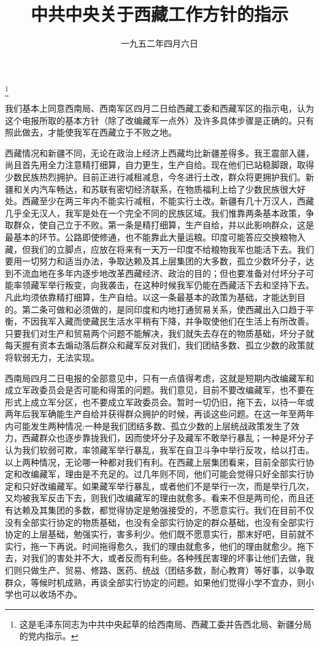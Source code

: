 
\title{中共中央关于西藏工作方针的指示}
\date{一九五二年四月六日}
\thanks{这是毛泽东同志为中共中央起草的给西南局、西藏工委并告西北局、新疆分局的党内指示。}
\maketitle


我们基本上同意西南局、西南军区四月二日给西藏工委和西藏军区的指示电，认为这个电报所取的基本方针（除了改编藏军一点外）及许多具体步骤是正确的。只有照此做去，才能使我军在西藏立于不败之地。

西藏情况和新疆不同，无论在政治上经济上西藏均比新疆差得多。我王震部入疆，尚且首先用全力注意精打细算，自力更生，生产自给。现在他们已站稳脚跟，取得少数民族热烈拥护。目前正进行减租减息，今冬进行土改，群众将更拥护我们。新疆和关内汽车畅达，和苏联有密切经济联系，在物质福利上给了少数民族很大好处。西藏至少在两三年内不能实行减租，不能实行土改。新疆有几十万汉人，西藏几乎全无汉人，我军是处在一个完全不同的民族区域。我们惟靠两条基本政策，争取群众，使自己立于不败。第一条是精打细算，生产自给，并以此影响群众，这是最基本的环节。公路即使修通，也不能靠此大量运粮。印度可能答应交换粮物入藏，但我们的立脚点，应放在将来有一天万一印度不给粮物我军也能活下去。我们要用一切努力和适当办法，争取达赖及其上层集团的大多数，孤立少数坏分子，达到不流血地在多年内逐步地改革西藏经济、政治的目的；但也要准备对付坏分子可能率领藏军举行叛变，向我袭击，在这种时候我军仍能在西藏活下去和坚持下去。凡此均须依靠精打细算，生产自给。以这一条最基本的政策为基础，才能达到目的。第二条可做和必须做的，是同印度和内地打通贸易关系，使西藏出入口趋于平衡，不因我军入藏而使藏民生活水平稍有下降，并争取使他们在生活上有所改善。只要我们对生产和贸易两个问题不能解决，我们就失去存在的物质基础，坏分子就每天握有资本去煽动落后群众和藏军反对我们，我们团结多数、孤立少数的政策就将软弱无力，无法实现。

西南局四月二日电报的全部意见中，只有一点值得考虑，这就是短期内改编藏军和成立军政委员会是否可能和得策的问题。我们意见，目前不要改编藏军，也不要在形式上成立军分区，也不要成立军政委员会。暂时一切仍旧，拖下去，以待一年或两年后我军确能生产自给并获得群众拥护的时候，再谈这些问题。在这一年至两年内可能发生两种情况:一种是我们团结多数、孤立少数的上层统战政策发生了效力，西藏群众也逐步靠拢我们，因而使坏分子及藏军不敢举行暴乱；一种是坏分子认为我们软弱可欺，率领藏军举行暴乱，我军在自卫斗争中举行反攻，给以打击。以上两种情况，无论哪一种都对我们有利。在西藏上层集团看来，目前全部实行协定和改编藏军，理由是不充足的。过几年则不同，他们可能会觉得只好全部实行协定和只好改编藏军。如果藏军举行暴乱，或者他们不是举行一次，而是举行几次，又均被我军反击下去，则我们改编藏军的理由就愈多。看来不但是两司伦，而且还有达赖及其集团的多数，都觉得协定是勉强接受的，不愿意实行。我们在目前不仅没有全部实行协定的物质基础，也没有全部实行协定的群众基础，也没有全部实行协定的上层基础，勉强实行，害多利少。他们既不愿意实行，那末好吧，目前就不实行，拖一下再说。时间拖得愈久，我们的理由就愈多，他们的理由就愈少。拖下去，对我们的害处并不大，或者反而有利些。各种残民害理的坏事让他们去做，我们则只做生产、贸易、修路、医药、统战（团结多数，耐心教育）等好事，以争取群众，等候时机成熟，再谈全部实行协定的问题。如果他们觉得小学不宜办，则小学也可以收场不办。

